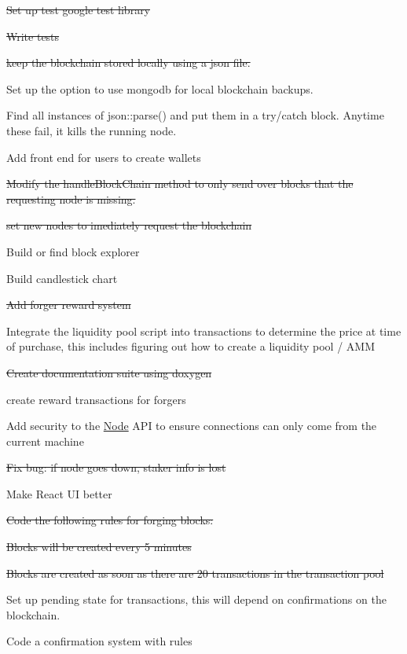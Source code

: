 
\begin{DoxyItemize}
\item \sout{Set up test google test library}
\item \sout{Write tests}
\item \sout{keep the blockchain stored locally using a json file.}
\item Set up the option to use mongodb for local blockchain backups.
\item Find all instances of json\+::parse() and put them in a try/catch block. Anytime these fail, it kills the running node.
\item Add front end for users to create wallets
\item \sout{Modify the handle\+Block\+Chain method to only send over blocks that the requesting node is missing.}
\item \sout{set new nodes to imediately request the blockchain}
\item Build or find block explorer
\item Build candlestick chart
\item \sout{Add forger reward system}
\item Integrate the liquidity pool script into transactions to determine the price at time of purchase, this includes figuring out how to create a liquidity pool / AMM
\item \sout{Create documentation suite using doxygen}
\item create reward transactions for forgers
\item Add security to the \mbox{\hyperlink{class_node}{Node}} API to ensure connections can only come from the current machine
\item \sout{Fix bug\+: if node goes down, staker info is lost}
\item Make React UI better
\item \sout{Code the following rules for forging blocks\+:}
\begin{DoxyItemize}
\item \sout{Blocks will be created every 5 minutes}
\item \sout{Blocks are created as soon as there are 20 transactions in the transaction pool}
\end{DoxyItemize}
\item Set up pending state for transactions, this will depend on confirmations on the blockchain.
\item Code a confirmation system with rules
\begin{DoxyItemize}

\end{DoxyItemize}
\end{DoxyItemize}
